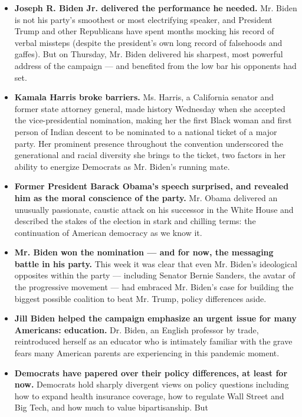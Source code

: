 \begin{itemize}
\item
  \textbf{Joseph R. Biden Jr. delivered the performance he needed.} Mr.
  Biden is not his party's smoothest or most electrifying speaker, and
  President Trump and other Republicans have spent months mocking his
  record of verbal missteps (despite the president's own long record of
  falsehoods and gaffes). But on Thursday, Mr. Biden delivered his
  sharpest, most powerful address of the campaign --- and benefited from
  the low bar his opponents had set.
\item
  \textbf{Kamala Harris broke barriers.} Ms. Harris, a California
  senator and former state attorney general, made history Wednesday when
  she accepted the vice-presidential nomination, making her the first
  Black woman and first person of Indian descent to be nominated to a
  national ticket of a major party. Her prominent presence throughout
  the convention underscored the generational and racial diversity she
  brings to the ticket, two factors in her ability to energize Democrats
  as Mr. Biden's running mate.
\item
  \textbf{Former President Barack Obama's speech surprised, and revealed
  him as the moral conscience of the party.} Mr. Obama delivered an
  unusually passionate, caustic attack on his successor in the White
  House and described the stakes of the election in stark and chilling
  terms: the continuation of American democracy as we know it.
\item
  \textbf{Mr. Biden won the nomination --- and for now, the messaging
  battle in his party.} This week it was clear that even Mr. Biden's
  ideological opposites within the party --- including Senator Bernie
  Sanders, the avatar of the progressive movement --- had embraced Mr.
  Biden's case for building the biggest possible coalition to beat Mr.
  Trump, policy differences aside.
\item
  \textbf{Jill Biden helped the campaign emphasize an urgent issue for
  many Americans: education.} Dr. Biden, an English professor by trade,
  reintroduced herself as an educator who is intimately familiar with
  the grave fears many American parents are experiencing in this
  pandemic moment.
\item
  \textbf{Democrats have papered over their policy differences, at least
  for now.} Democrats hold sharply divergent views on policy questions
  including how to expand health insurance coverage, how to regulate
  Wall Street and Big Tech, and how much to value bipartisanship. But

\end{itemize}
